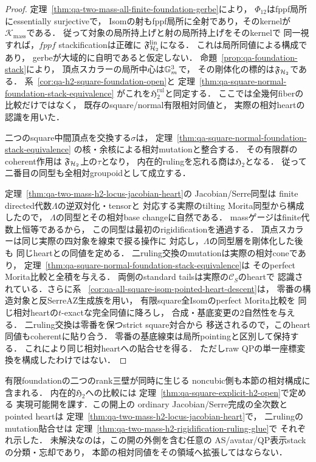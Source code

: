 \begin{proof}
定理~\ref{thm:qa-two-mass-all-finite-foundation-gerbe}により，
$\Phi_{12}$はfppf局所にessentially surjectiveで，
Isomの射もfppf局所に全射であり，そのkernelが
$\mathcal K_{\mathrm{mass}}$である．
従って対象の局所持上げと射の局所持上げをそのkernelで
同一視すれば，$fppf$ stackificationは正確に
$\mathfrak F_{\mathcal H_2}^{\mathrm{lin}}$になる．
これは局所同値による構成であり，
gerbeが大域的に自明であると仮定しない．
命題~\ref{prop:qa-foundation-stack}により，
頂点スカラーの局所中心は$\mathbb G_m^3$で，
その剛体化の標的は$\mathfrak F_{\mathcal H_2}$である．
系~\ref{cor:qa-h2-square-foundation-open}と
定理~\ref{thm:qa-square-normal-foundation-stack-equivalence}
がこれを$\mathfrak H_2^{\mathrm{rul}}$と同定する．
ここでは全幾何fiberの比較だけではなく，
既存のsquare/normal有限相対同値と，
実際の相対heartの認識を用いた．

二つのsquare中間頂点を交換する$\sigma$は，
定理~\ref{thm:qa-square-normal-foundation-stack-equivalence}
の核・余核による相対mutationと整合する．
その有限群のcoherent作用は
$\mathfrak F_{\mathcal H_2}$上の$\tau$となり，
内在的rulingを忘れる商は$\mathfrak H_2$となる．
従って二番目の同型も全相対groupoidとして成立する．

定理~\ref{thm:qa-two-mass-h2-locus-jacobian-heart}の
Jacobian/Serre同型は
finite directed代数$\Lambda$の逆双対化・tensorと
対応する実際のtilting Morita同型から構成したので，
$\Lambda$の同型とその相対base changeに自然である．
massゲージはfinite代数上恒等であるから，
この同型は最初のrigidificationを通過する．
頂点スカラーは同じ実際の四対象を線束で捩る操作に
対応し，$\Lambda$の同型層を剛体化した後も
同じheartとの同値を定める．
二ruling交換のmutationは実際の相対coneであり，
定理~\ref{thm:qa-square-normal-foundation-stack-equivalence}は
そのperfect Morita比較と全積を与える．
両側のstandard tailsは実際の$\mathcal C_S$のheartで
認識されている．さらに系~
\ref{cor:qa-all-square-isom-pointed-heart-descent}は，
零番の構造対象と反SerreAZ生成族を用い，
有限square全Isomのperfect Morita比較を
同じ相対heartの$t$-exactな完全同値に降ろし，
合成・基底変更の$2$自然性を与える．
二ruling交換は零番を保つstrict square対合から
移送されるので，このheart同値もcoherentに貼り合う．
零番の基底線束は局所pointingと区別して保持する．
これにより同じ相対heartへの貼合せを得る．
ただしraw QPの単一座標変換を構成したわけではない．
\end{proof}

\begin{remark}[相対$H_2$で解決した比較と残る表示の問題]
\label{rem:qa-two-mass-heart-scope}
有限foundationの二つのrank三壁が同時に生じる
noncubic側も本節の相対構成に含まれる．
内在的$\mathfrak H_2$への比較には
定理~\ref{thm:qa-square-explicit-h2-open}で定める
実現可能開を課す．この開上の
ordinary Jacobian/Serre完成の全次数とpointed heartは
定理~\ref{thm:qa-two-mass-h2-locus-jacobian-heart}で，
二rulingのmutation貼合せは
定理~\ref{thm:qa-two-mass-h2-rigidification-ruling-glue}で
それぞれ示した．
未解決なのは，この開の外側を含む任意の
AS/avatar/QP表示stackの分類・忘却であり，
本節の相対同値をその領域へ拡張してはならない．
\end{remark}


